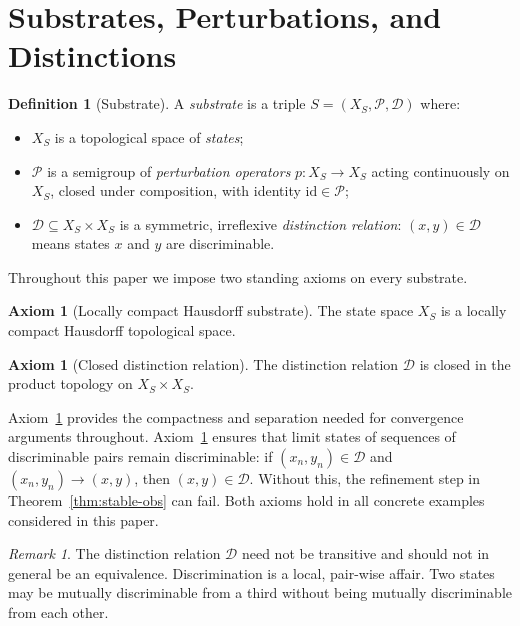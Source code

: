\documentclass[12pt, oneside]{article}
\theoremstyle{plain}
\theoremstyle{definition}
\newtheorem{definition}[theorem]{Definition}
\theoremstyle{remark}
\newtheorem{remark}[theorem]{Remark}
\theoremstyle{definition}
\newtheorem{axiom}[theorem]{Axiom}
\newcommand{\Xsub}{X_S}
\newcommand{\Psub}{\mathcal{P}}
\newcommand{\Dsub}{\mathcal{D}}
\begin{document}
\section{Substrates, Perturbations, and Distinctions}
\label{sec:substrate}

\begin{definition}[Substrate]
  A \emph{substrate} is a triple $S = (\Xsub, \Psub, \Dsub)$ where:
  \begin{itemize}
    \item $\Xsub$ is a topological space of \emph{states};
    \item $\Psub$ is a semigroup of \emph{perturbation operators}
      $p : \Xsub \to \Xsub$ acting continuously on $\Xsub$, closed
      under composition, with identity $\mathrm{id} \in \Psub$;
    \item $\Dsub \subseteq \Xsub \times \Xsub$ is a symmetric,
      irreflexive \emph{distinction relation}: $(x,y) \in \Dsub$
      means states $x$ and $y$ are discriminable.
  \end{itemize}
\end{definition}

Throughout this paper we impose two standing axioms on every substrate.

\begin{axiom}[Locally compact Hausdorff substrate]
  The state space $\Xsub$ is a locally compact Hausdorff topological
  space.
  \label{ax:lch}
\end{axiom}

\begin{axiom}[Closed distinction relation]
  The distinction relation $\Dsub$ is closed in the product topology
  on $\Xsub \times \Xsub$.
  \label{ax:closed-d}
\end{axiom}

Axiom~\ref{ax:lch} provides the compactness and separation needed for
convergence arguments throughout.
Axiom~\ref{ax:closed-d} ensures that limit states of sequences of
discriminable pairs remain discriminable: if $(x_n, y_n) \in \Dsub$
and $(x_n, y_n) \to (x, y)$, then $(x, y) \in \Dsub$.
Without this, the refinement step in Theorem~\ref{thm:stable-obs} can
fail.
Both axioms hold in all concrete examples considered in this paper.

\begin{remark}
  The distinction relation $\Dsub$ need not be transitive and should
  not in general be an equivalence.
  Discrimination is a local, pair-wise affair.
  Two states may be mutually discriminable from a third without being
  mutually discriminable from each other.
\end{remark}
\end{document}
